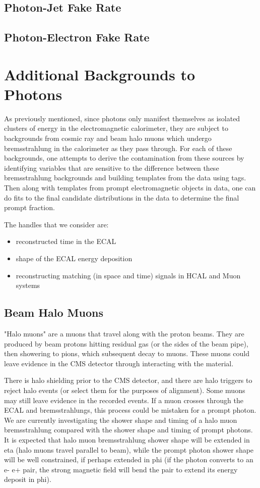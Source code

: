 \documentclass{cmspaper}
\begin{document}
\subsection{Photon-Jet Fake Rate}
\subsection{Photon-Electron Fake Rate}


\section{Additional Backgrounds to Photons}
As previously mentioned, since photons only manifest themselves as isolated clusters of energy in the electromagnetic calorimeter, they are subject to backgrounds from cosmic ray and beam halo muons which undergo bremsstrahlung in the calorimeter as they pass through.  For each of these backgrounds, one attempts to derive the contamination from these sources by identifying variables that are sensitive to the difference between these bremsstrahlung backgrounds and building templates from the data using tags.  Then along with templates from prompt electromagnetic objects in data, one can do fits to the final candidate distributions in the data to determine the final prompt fraction.

The handles that we consider are:
\begin{itemize}
\item reconstructed time in the ECAL
\item shape of the ECAL energy deposition
\item reconstructing matching (in space and time) signals in HCAL and Muon systems   
\end{itemize}

\subsection{Beam Halo Muons}

"Halo muons" are a muons that travel along with the proton beams. They are
produced by beam protons hitting residual gas (or the sides of the
beam pipe), then showering to pions, which subsequent decay to muons.
These muons could leave evidence in the CMS detector through interacting with
the material.

There is halo shielding prior to the CMS detector, and there are halo
triggers to reject halo events (or select them for the purposes of alignment). 
Some muons may still leave evidence in the recorded events.  If a muon crosses through the 
ECAL and bremsstrahlungs, this process could be mistaken for a prompt photon. 
We are currently investigating the shower shape and timing of a halo muon bremsstrahlung compared with
the shower shape and timing of prompt photons.  It is expected that halo muon
bremsstrahlung shower shape will be extended in eta (halo muons travel
parallel to beam), while the prompt photon shower shape will be well constrained, if perhaps
extended in phi (if the photon converts to an e- e+ pair, the strong
magnetic field will bend the pair to extend its energy deposit in phi).
\end{document}

